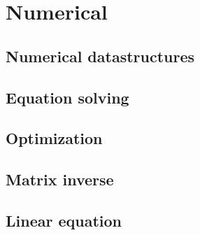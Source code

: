 
\chapter{Numerical}

\section{Numerical datastructures}

\section{Equation solving}

\section{Optimization}

\section{Matrix inverse}

\section{Linear equation}

